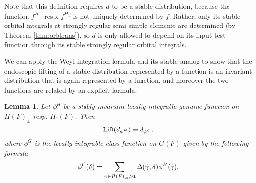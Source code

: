 \documentclass{article}
\newtheorem{lem}[thm]{Lemma}
\theoremstyle{definition}
\numberwithin{equation}{section}
\renewcommand{\-}{\hyp{}}
\begin{document}
Note that this definition requires $d$ to be a stable distribution, because the function $f^{H_\pm}$ resp. $f^{H_1}$ is not uniquely determined by $f$. Rather, only its stable orbital integrals at strongly regular semi-simple elements are determined (by Theorem \ref{thm:orbtrans}), so $d$ is only allowed to depend on its input test function through its stable strongly regular orbital integrals.

We can apply the Weyl integration formula and its stable analog to show that the endoscopic lifting of a stable distribution represented by a function is an invariant distribution that is again represented by a function, and moreover the two functions are related by an explicit formula.

\begin{lem} \label{lem:equi}
	Let $\phi^H$ be a stably-invariant locally integrable genuine function on $H(F)_\pm$ resp. $H_1(F)$. Then 
	\[ \textrm{Lift}(d_{\phi^H}) = d_{\phi^G}, \]
	where $\phi^G$ is the locally integrable class function on $G(F)$ given by the following formula
	\[ \phi^G(\delta) = \sum_{\gamma \in H(F)_{\textrm{rs}}/\textrm{st} } \Delta(\dot\gamma,\delta) \phi^H(\dot\gamma). \]
	\end{lem}
\end{document}
